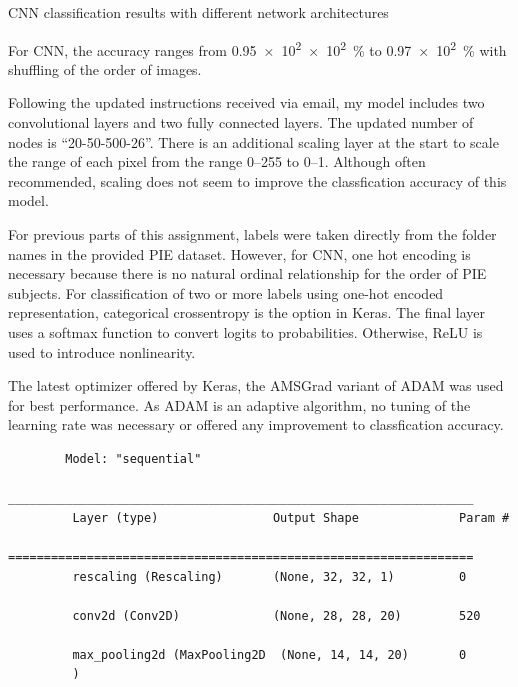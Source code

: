 \documentclass[a4paper]{exam}
\newcommand\percentage[2][round-precision = 2]{%
    \qty[round-mode = places,
        scientific-notation = fixed, fixed-exponent = 0,
        output-decimal-marker={.}, #1]{#2e2}{\percent}%
}
\begin{document}
\begin{questions}
    \clearpage\question CNN classification results with different network architectures

    For CNN, the accuracy ranges from \percentage{0.95e2}to \percentage{0.97} with shuffling of the order of images.

    Following the updated instructions received via email, my model includes two convolutional layers and two fully connected layers.
    The updated number of nodes is ``20-50-500-26''.
    There is an additional scaling layer at the start to scale the range of each pixel from the range \numrange[range-phrase = --]{0}{255} to \numrange[range-phrase = --]{0}{1}.
    Although often recommended, scaling does not seem to improve the classfication accuracy of this model.

    For previous parts of this assignment, labels were taken directly from the folder names in the provided PIE dataset.
    However, for CNN, one hot encoding is necessary because there is no natural ordinal relationship for the order of PIE subjects.
    For classification of two or more labels using one-hot encoded representation, categorical crossentropy is the option in Keras.
    The final layer uses a softmax function to convert logits to probabilities. Otherwise, ReLU is used to introduce nonlinearity.

    The latest optimizer offered by Keras, the AMSGrad variant of ADAM was used for best performance.
    As ADAM is an adaptive algorithm, no tuning of the learning rate was necessary or offered any improvement to classfication accuracy.

    \begin{listing}[!ht]
        \begin{verbatim}
        Model: "sequential"
        _________________________________________________________________
         Layer (type)                Output Shape              Param #   
        =================================================================
         rescaling (Rescaling)       (None, 32, 32, 1)         0         
                                                                         
         conv2d (Conv2D)             (None, 28, 28, 20)        520       
                                                                         
         max_pooling2d (MaxPooling2D  (None, 14, 14, 20)       0         
         )                                                               
                                                                         

\end{verbatim}
\end{listing}
\end{questions}
\end{document}
